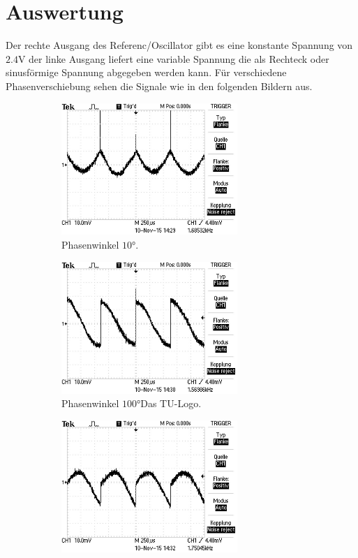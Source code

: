 \section{Auswertung}
\label{sec:Auswertung}
Der rechte Ausgang des Referenc/Oscillator gibt es eine konstante Spannung
von $2.4\si{\volt}$ der linke Ausgang liefert eine variable Spannung die
als Rechteck oder sinusförmige Spannung abgegeben werden kann. Für verschiedene
Phasenverschiebung sehen die Signale wie in den folgenden
Bildern aus.
\begin{figure}
\centering
\begin{subfigure}{0.48\textwidth}
\centering
\includegraphics[height=5cm]{Bilder/or/or10.JPG}
\caption{Phasenwinkel $10°$.}
\label{fig:orp10}
\end{subfigure}
\begin{subfigure}{0.48\textwidth}
\centering
\includegraphics[height=5cm]{Bilder/or/or100.JPG}
\caption{Phasenwinkel $100°$Das TU-Logo.}
\label{fig:orp100}
\end{subfigure}
\begin{subfigure}{0.48\textwidth}
\centering
\includegraphics[height=5cm]{Bilder/or/or150.JPG}

\end{subfigure}
\end{figure}
